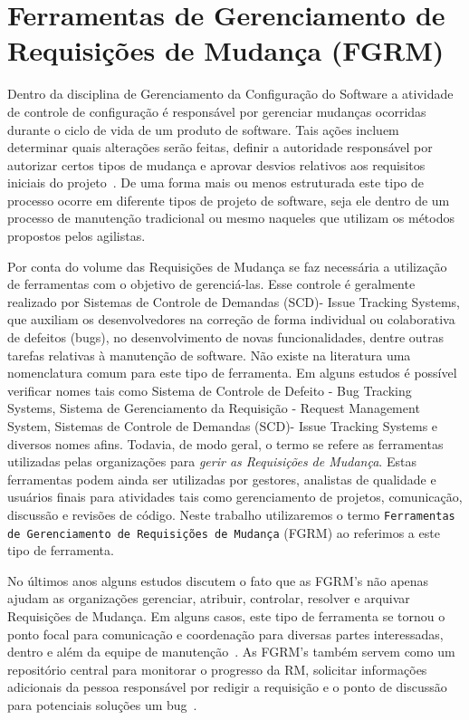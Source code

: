 \section{Ferramentas de Gerenciamento de Requisições de Mudança (FGRM)}
\label{sec:ferramentas_de_gerenciameto_de_requisições_de_mudança}

Dentro da disciplina de Gerenciamento da Configuração do Software a atividade de
controle de configuração é responsável por gerenciar mudanças ocorridas durante
o ciclo de vida de um produto de software. Tais ações incluem determinar quais
alterações serão feitas, definir a autoridade responsável por autorizar certos
tipos de mudança e aprovar desvios relativos aos requisitos iniciais do
projeto~\cite{4425813}. De uma forma mais ou menos estruturada este tipo de
processo ocorre em diferente tipos de projeto de software, seja ele dentro de um
processo de manutenção tradicional ou mesmo naqueles que utilizam os métodos
propostos pelos agilistas.

Por conta do volume das Requisições de Mudança se faz necessária a utilização de
ferramentas com o objetivo de gerenciá-las. Esse controle é geralmente realizado
por Sistemas de Controle de Demandas (SCD)- Issue Tracking Systems, que auxiliam
os desenvolvedores na correção de forma individual ou colaborativa de defeitos
(bugs), no desenvolvimento de novas funcionalidades, dentre outras tarefas
relativas à manutenção de software. Não existe na literatura uma nomenclatura
comum para este tipo de ferramenta. Em alguns estudos é possível verificar nomes
tais como Sistema de Controle de Defeito - Bug Tracking Systems, Sistema de
Gerenciamento da Requisição - Request Management System, Sistemas de Controle de
Demandas (SCD)- Issue Tracking Systems e diversos nomes afins. Todavia, de modo
geral, o termo se refere as ferramentas utilizadas pelas organizações para
\textit{gerir as Requisições de Mudança}. Estas ferramentas podem ainda ser
utilizadas por gestores, analistas de qualidade e usuários finais para
atividades tais como gerenciamento de projetos, comunicação, discussão e
revisões de código. Neste trabalho utilizaremos o termo \texttt{Ferramentas de
	Gerenciamento de Requisições de Mudança} (FGRM) ao referimos a este tipo de
ferramenta.

No últimos anos alguns estudos discutem o fato que as FGRM's não apenas ajudam
as organizações gerenciar, atribuir, controlar, resolver e arquivar Requisições
de Mudança. Em alguns casos, este tipo de ferramenta se tornou o ponto focal
para comunicação e coordenação para diversas partes interessadas, dentro e além
da equipe de manutenção~\cite{Bertram:2010:CCB:1718918.1718972}.  As FGRM's
também servem como um repositório central para monitorar o progresso da RM,
solicitar informações adicionais da pessoa responsável por redigir a requisição
e o ponto de discussão para potenciais soluções um
bug~\cite{zimmermann2009improving}.

